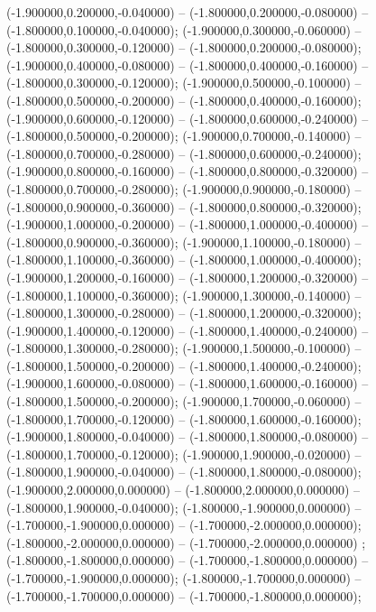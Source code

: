  (-1.900000,0.200000,-0.040000) -- (-1.800000,0.200000,-0.080000) -- (-1.800000,0.100000,-0.040000);
 (-1.900000,0.300000,-0.060000) -- (-1.800000,0.300000,-0.120000) -- (-1.800000,0.200000,-0.080000);
 (-1.900000,0.400000,-0.080000) -- (-1.800000,0.400000,-0.160000) -- (-1.800000,0.300000,-0.120000);
 (-1.900000,0.500000,-0.100000) -- (-1.800000,0.500000,-0.200000) -- (-1.800000,0.400000,-0.160000);
 (-1.900000,0.600000,-0.120000) -- (-1.800000,0.600000,-0.240000) -- (-1.800000,0.500000,-0.200000);
 (-1.900000,0.700000,-0.140000) -- (-1.800000,0.700000,-0.280000) -- (-1.800000,0.600000,-0.240000);
 (-1.900000,0.800000,-0.160000) -- (-1.800000,0.800000,-0.320000) -- (-1.800000,0.700000,-0.280000);
 (-1.900000,0.900000,-0.180000) -- (-1.800000,0.900000,-0.360000) -- (-1.800000,0.800000,-0.320000);
 (-1.900000,1.000000,-0.200000) -- (-1.800000,1.000000,-0.400000) -- (-1.800000,0.900000,-0.360000);
 (-1.900000,1.100000,-0.180000) -- (-1.800000,1.100000,-0.360000) -- (-1.800000,1.000000,-0.400000);
 (-1.900000,1.200000,-0.160000) -- (-1.800000,1.200000,-0.320000) -- (-1.800000,1.100000,-0.360000);
 (-1.900000,1.300000,-0.140000) -- (-1.800000,1.300000,-0.280000) -- (-1.800000,1.200000,-0.320000);
 (-1.900000,1.400000,-0.120000) -- (-1.800000,1.400000,-0.240000) -- (-1.800000,1.300000,-0.280000);
 (-1.900000,1.500000,-0.100000) -- (-1.800000,1.500000,-0.200000) -- (-1.800000,1.400000,-0.240000);
 (-1.900000,1.600000,-0.080000) -- (-1.800000,1.600000,-0.160000) -- (-1.800000,1.500000,-0.200000);
 (-1.900000,1.700000,-0.060000) -- (-1.800000,1.700000,-0.120000) -- (-1.800000,1.600000,-0.160000);
 (-1.900000,1.800000,-0.040000) -- (-1.800000,1.800000,-0.080000) -- (-1.800000,1.700000,-0.120000);
 (-1.900000,1.900000,-0.020000) -- (-1.800000,1.900000,-0.040000) -- (-1.800000,1.800000,-0.080000);
 (-1.900000,2.000000,0.000000) -- (-1.800000,2.000000,0.000000) -- (-1.800000,1.900000,-0.040000);
 (-1.800000,-1.900000,0.000000) -- (-1.700000,-1.900000,0.000000) -- (-1.700000,-2.000000,0.000000);
 (-1.800000,-2.000000,0.000000) -- (-1.700000,-2.000000,0.000000) ;
 (-1.800000,-1.800000,0.000000) -- (-1.700000,-1.800000,0.000000) -- (-1.700000,-1.900000,0.000000);
 (-1.800000,-1.700000,0.000000) -- (-1.700000,-1.700000,0.000000) -- (-1.700000,-1.800000,0.000000);
